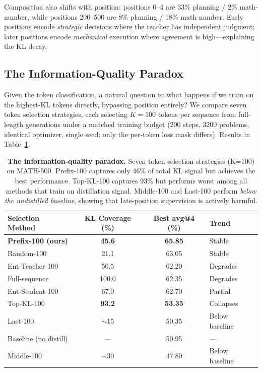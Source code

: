\documentclass[10pt]{article}
\begin{document}
Composition also shifts with position: positions 0--4 are 33\% planning / 2\% math-number, while positions 200--500 are 8\% planning / 18\% math-number.
Early positions encode \emph{strategic} decisions where the teacher has independent judgment; later positions encode \emph{mechanical} execution where agreement is high---explaining the KL decay.

\subsection{The Information-Quality Paradox}
\label{sec:paradox}

Given the token classification, a natural question is: what happens if we train on the highest-KL tokens directly, bypassing position entirely?
We compare seven token selection strategies, each selecting $K=100$ tokens per sequence from full-length generations under a matched training budget (200 steps, 3200 problems, identical optimizer, single seed; only the per-token loss mask differs). Results in Table~\ref{tab:paradox}.

\begin{table}[t]
\centering
\caption{\textbf{The information-quality paradox.} Seven token selection strategies (K=100) on MATH-500. Prefix-100 captures only 46\% of total KL signal but achieves the best performance. Top-KL-100 captures 93\% but performs worst among all methods that train on distillation signal. Middle-100 and Last-100 perform \emph{below the undistilled baseline}, showing that late-position supervision is actively harmful.}
\label{tab:paradox}
\small
\begin{tabular}{@{}lccl@{}}
\toprule
\textbf{Selection Method} & \textbf{KL Coverage (\%)} & \textbf{Best avg@4 (\%)} & \textbf{Trend} \\
\midrule
\textbf{Prefix-100 (ours)}  & \textbf{45.6}  & \textbf{65.85} & Stable \\
Random-100                   & 21.1           & 63.05          & Stable \\
Ent-Teacher-100              & 50.5           & 62.20          & Degrades \\
Full-sequence                & 100.0          & 62.35          & Degrades \\
Ent-Student-100              & 67.0           & 62.70          & Partial \\
Top-KL-100                   & \textbf{93.2}  & \textbf{53.35} & Collapses \\
\midrule
Last-100                     & $\sim$15       & 50.35          & Below baseline \\
Baseline (no distill)        & ---            & 50.95          & --- \\
Middle-100                   & $\sim$30       & 47.80          & Below baseline \\
\bottomrule
\end{tabular}
\end{table}
\end{document}
